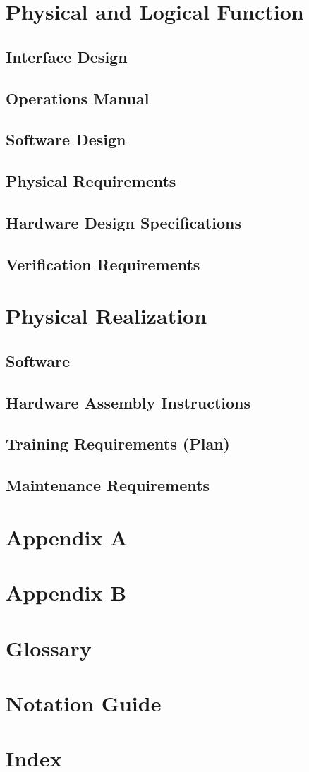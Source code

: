 \documentclass[12pt]{report}
\begin{document}
\chapter{Physical and Logical Function}
\section{Interface Design}
\section{Operations Manual}
\section{Software Design}
\section{Physical Requirements}
\section{Hardware Design Specifications}
\section{Verification Requirements}

\chapter{Physical Realization}
\section{Software}
\section{Hardware Assembly Instructions}
\section{Training Requirements (Plan)}
\section{Maintenance Requirements}

\appendix

\chapter{Appendix A}

\chapter{Appendix B}

\chapter{Glossary}

\chapter{Notation Guide}

\chapter{Index}
\end{document}
